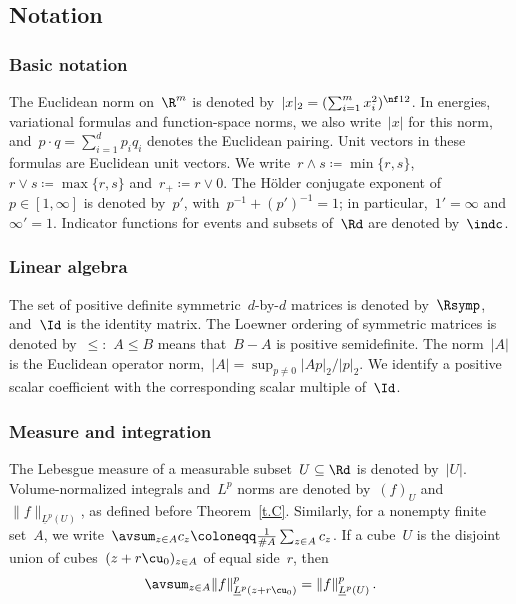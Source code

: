 \documentclass[11pt]{amsart}
\begin{document}
\subsection{Notation}
\label{s.notation}

\subsubsection*{Basic notation}
The Euclidean norm on~$\R^m$ is denoted by~$|x|_2=(\sum_{i=1}^m x_i^2)^{\nf12}$. In energies, variational formulas and function-space norms, we also write~$|x|$ for this norm, and~$p\cdot q=\sum_{i=1}^d p_iq_i$ denotes the Euclidean pairing. Unit vectors in these formulas are Euclidean unit vectors. We write~$r\wedge s\coloneqq\min\{r,s\}$,~$r\vee s\coloneqq\max\{r,s\}$ and~$r_+\coloneqq r\vee0$. The H\"older conjugate exponent of~$p\in[1,\infty]$ is denoted by~$p'$, with~$p^{-1}+(p')^{-1}=1$; in particular,~$1'=\infty$ and~$\infty'=1$. Indicator functions for events and subsets of~$\Rd$ are denoted by~$\indc$.

\subsubsection*{Linear algebra}
The set of positive definite symmetric~$d$-by-$d$ matrices is denoted by~$\Rsymp$, and~$\Id$ is the identity matrix. The Loewner ordering of symmetric matrices is denoted by~$\leq$:~$A\leq B$ means that~$B-A$ is positive semidefinite. The norm~$|A|$ is the Euclidean operator norm,~$|A|=\sup_{p\neq0}|Ap|_2/|p|_2$. We identify a positive scalar coefficient with the corresponding scalar multiple of~$\Id$.

\subsubsection*{Measure and integration}
The Lebesgue measure of a measurable subset~$U\subseteq\Rd$ is denoted by~$|U|$. Volume-normalized integrals and~$L^p$ norms are denoted by~$(f)_U$ and~$\|f\|_{\underline L^p(U)}$, as defined before Theorem~\ref{t.C}. Similarly, for a nonempty finite set~$A$, we write~$\avsum_{z\in A}c_z\coloneqq\frac1{\#A}\sum_{z\in A}c_z$. If a cube~$U$ is the disjoint union of cubes~$(z+r\cu_0)_{z\in A}$ of equal side~$r$, then
\begin{equation}
	\avsum_{z\in A}
	\|f\|_{\underline L^p(z+r\cu_0)}^p
	=
	\|f\|_{\underline L^p(U)}^p\,.
	\label{e.average.normalized.norm.partition}
\end{equation}
\end{document}
